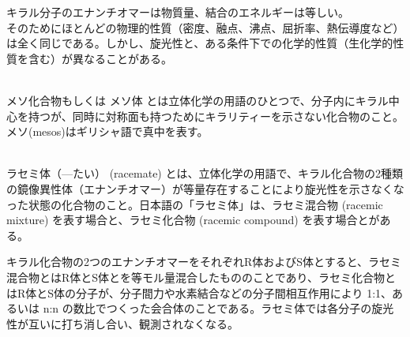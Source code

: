 \documentclass[dvipdfmx,uplatex,twocolumn,10pt]{jsarticle}
\begin{document}
キラル分子のエナンチオマーは物質量、結合のエネルギーは等しい。 \\
そのためにほとんどの物理的性質（密度、融点、沸点、屈折率、熱伝導度など）は全く同じである。しかし、旋光性と、ある条件下での化学的性質（生化学的性質を含む）が異なることがある。 \\

\begin{defi} \mbox{} \\
メソ化合物もしくは メソ体 とは立体化学の用語のひとつで、分子内にキラル中心を持つが、同時に対称面も持つためにキラリティーを示さない化合物のこと。メソ(mesos)はギリシャ語で真中を表す。 \\
\end{defi}

\begin{defi} \mbox{} \\
ラセミ体（—たい） (racemate) とは、立体化学の用語で、キラル化合物の2種類の鏡像異性体（エナンチオマー）が等量存在することにより旋光性を示さなくなった状態の化合物のこと。日本語の「ラセミ体」は、ラセミ混合物 (racemic mixture) を表す場合と、ラセミ化合物 (racemic compound) を表す場合とがある。 \\
\end{defi}

キラル化合物の2つのエナンチオマーをそれぞれR体およびS体とすると、ラセミ混合物とはR体とS体とを等モル量混合したもののことであり、ラセミ化合物とはR体とS体の分子が、分子間力や水素結合などの分子間相互作用により 1:1、あるいは n:n の数比でつくった会合体のことである。ラセミ体では各分子の旋光性が互いに打ち消し合い、観測されなくなる。 \\
\end{document}
